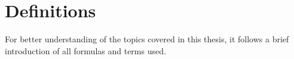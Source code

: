 \chapter{Definitions}\label{ch:definitions}

For better understanding of the topics covered in this thesis, it follows a brief introduction of all formulas and terms used.







